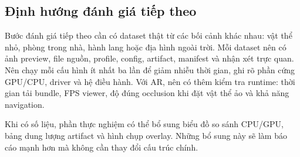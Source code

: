 \subsection{Định hướng đánh giá tiếp theo}

Bước đánh giá tiếp theo cần có dataset thật từ các bối cảnh khác nhau: vật thể nhỏ, phòng trong nhà, hành lang hoặc địa hình ngoài trời. Mỗi dataset nên có ảnh preview, file nguồn, profile, config, artifact, manifest và nhận xét trực quan. Nên chạy mỗi cấu hình ít nhất ba lần để giảm nhiễu thời gian, ghi rõ phần cứng GPU/CPU, driver và hệ điều hành. Với AR, nên có thêm kiểm tra runtime: thời gian tải bundle, FPS viewer, độ đúng occlusion khi đặt vật thể ảo và khả năng navigation.

Khi có số liệu, phần thực nghiệm có thể bổ sung biểu đồ so sánh CPU/GPU, bảng dung lượng artifact và hình chụp overlay. Những bổ sung này sẽ làm báo cáo mạnh hơn mà không cần thay đổi cấu trúc chính.
